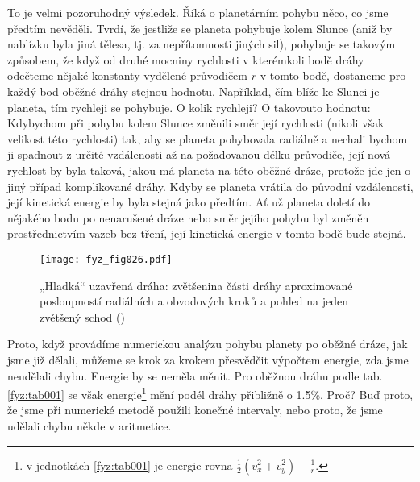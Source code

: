 {    To je velmi pozoruhodný výsledek. Říká o planetárním pohybu něco, co jsme předtím nevěděli. 
    Tvrdí, že jestliže se planeta pohybuje kolem Slunce (aniž by nablízku byla jiná tělesa, tj. za 
    nepřítomnosti jiných sil), pohybuje se takovým způsobem, že když od druhé mocniny rychlosti v 
    kterémkoli bodě dráhy odečteme nějaké konstanty vydělené průvodičem \(r\) v tomto bodě, 
    dostaneme pro každý bod oběžné dráhy stejnou hodnotu. Například, čím blíže ke Slunci je 
    planeta, tím rychleji se pohybuje. O kolik rychleji? O takovouto hodnotu: Kdybychom při pohybu 
    kolem Slunce změnili směr její rychlosti (nikoli však velikost této rychlosti) tak, aby se 
    planeta pohybovala radiálně a nechali bychom ji spadnout z určité vzdálenosti až na požadovanou 
    délku průvodiče, její nová rychlost by byla taková, jakou má planeta na této oběžné dráze, 
    protože jde jen o jiný případ komplikované dráhy. Kdyby se planeta vrátila do původní 
    vzdálenosti, její kinetická energie by byla stejná jako předtím. Ať už planeta doletí do 
    nějakého bodu po nenarušené dráze nebo směr jejího pohybu byl změněn prostřednictvím vazeb bez 
    tření, její kinetická energie v tomto bodě bude stejná.

    \begin{figure}[ht!]  %
      \centering
      \texttt{[image: fyz\_fig026.pdf]}
      \caption{„Hladká“ uzavřená dráha: zvětšenina části dráhy aproximované posloupností radiálních 
      a obvodových kroků a pohled na jeden zvětšený schod (\cite[s.~191]{Feynman01})}
      \label{fyz:fig026}
    \end{figure}
    Proto, když provádíme numerickou analýzu pohybu planety po oběžné dráze, jak jsme již dělali, 
    můžeme se krok za krokem přesvědčit výpočtem energie, zda jsme neudělali chybu. Energie by se 
    neměla měnit. Pro oběžnou dráhu podle tab. \ref{fyz:tab001} se však energie\footnote{v 
    jednotkách \ref{fyz:tab001} je energie rovna \(\frac{1}{2}(v_x^2+v_y^2)-\frac{1}{r}\).} mění 
    podél dráhy přibližně o \num{1.5}\%. Proč? Buď proto, že jsme při numerické metodě použili 
    konečné intervaly, nebo proto, že jsme udělali chybu někde v aritmetice.
    
}
